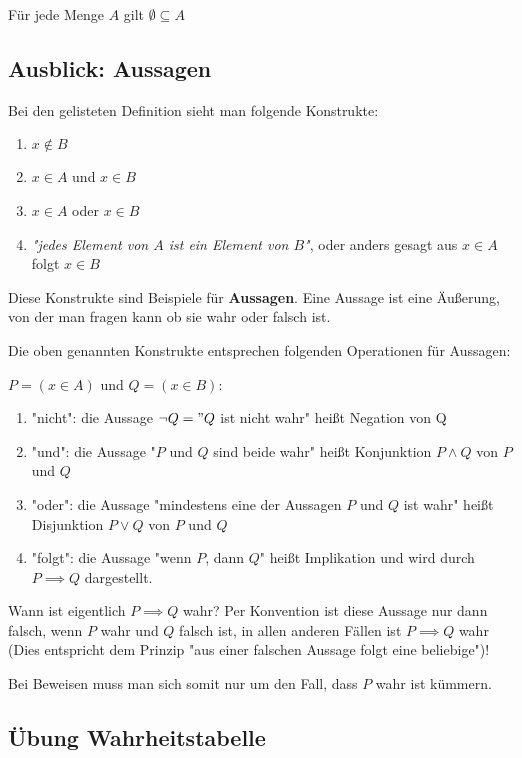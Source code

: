 \documentclass{article}
\begin{document}
Für jede Menge $A$ gilt $\emptyset \subseteq A$

\subsection*{Ausblick: Aussagen}

Bei den gelisteten Definition sieht man folgende Konstrukte:

\begin{enumerate}
\item $x \notin B$
\item $x \in A$ und $x \in B$
\item $x \in A$ oder $x \in B$
\item \emph{"jedes Element von $A$ ist ein Element von $B$"}, oder anders gesagt aus $x \in A$ folgt $x \in B$
\end{enumerate}

Diese Konstrukte sind Beispiele für \textbf{Aussagen}. Eine Aussage ist eine Äußerung, von der man fragen kann
ob sie wahr oder falsch ist.

Die oben genannten Konstrukte entsprechen folgenden Operationen für Aussagen:

$P = (x \in A)$ und $Q = (x \in B)$:
\begin{enumerate}
\item "nicht": die Aussage $\neg Q = "Q$ ist nicht wahr" heißt Negation von Q
\item "und": die Aussage "$P$ und $Q$ sind beide wahr" heißt Konjunktion $P \wedge Q$ von $P$ und $Q$
\item "oder": die Aussage "mindestens eine der Aussagen $P$ und $Q$ ist wahr" heißt Disjunktion $P \vee Q$ von
  $P$ und $Q$
\item "folgt": die Aussage "wenn $P$, dann $Q$" heißt Implikation und wird durch $P \implies Q$ dargestellt.
\end{enumerate}

Wann ist eigentlich $P \implies Q$ wahr? Per Konvention ist diese Aussage nur dann falsch, wenn $P$ wahr und
$Q$ falsch ist, in allen anderen Fällen ist $P \implies Q$ wahr (Dies entspricht dem Prinzip "aus einer falschen Aussage folgt eine beliebige")!

Bei Beweisen muss man sich somit nur um den Fall, dass $P$ wahr ist kümmern.

\subsection*{Übung Wahrheitstabelle}
\end{document}
